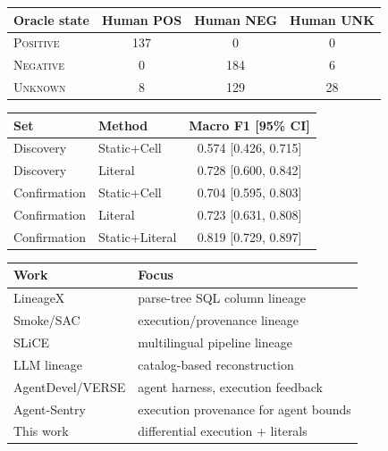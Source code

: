 \documentclass[sigconf, nonacm]{acmart}
\begin{document}
\begin{center}
\begin{minipage}{\linewidth}
\centering
{}
\label{tab:tristate}
\begin{tabular}{lccc}
\toprule
Oracle state & Human POS & Human NEG & Human UNK \\
\midrule
\textsc{Positive} & 137 & 0 & 0 \\
\textsc{Negative} & 0 & 184 & 6 \\
\textsc{Unknown} & 8 & 129 & 28 \\
\bottomrule
\end{tabular}
\end{minipage}
\end{center}

\begin{center}
\label{tab:ci}
\begin{tabular}{llc}
\toprule
Set & Method & Macro F1 [95\% CI] \\
\midrule
Discovery & Static+Cell & 0.574 [0.426, 0.715] \\
Discovery & Literal & 0.728 [0.600, 0.842] \\
Confirmation & Static+Cell & 0.704 [0.595, 0.803] \\
Confirmation & Literal & 0.723 [0.631, 0.808] \\
Confirmation & Static+Literal & 0.819 [0.729, 0.897] \\
\bottomrule
\end{tabular}
\end{center}

\begin{center}
\begin{minipage}{\linewidth}
\centering
{}
\label{tab:positioning}
\begin{tabularx}{\linewidth}{>{\raggedright\arraybackslash}p{2.75cm}>{\raggedright\arraybackslash}X}
\toprule
Work & Focus \\
\midrule
LineageX & parse-tree SQL column lineage \\
Smoke/SAC & execution/provenance lineage \\
SLiCE & multilingual pipeline lineage \\
LLM lineage & catalog-based reconstruction \\
AgentDevel/VERSE & agent harness, execution feedback \\
Agent-Sentry & execution provenance for agent bounds \\
This work & differential execution + literals \\
\bottomrule
\end{tabularx}
\end{minipage}
\end{center}
\end{document}
